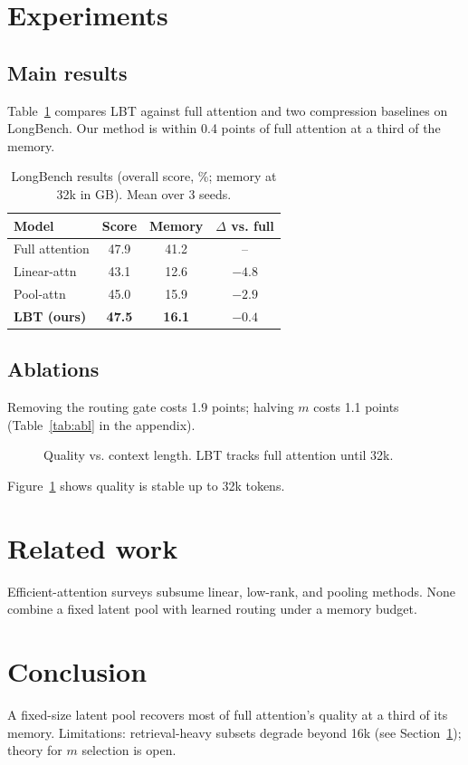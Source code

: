 \documentclass{article}
\begin{document}
\section{Experiments}\label{sec:exp}
\subsection{Main results}
Table~\ref{tab:main} compares LBT against full attention and two compression
baselines on LongBench. Our method is within 0.4 points of full attention at
a third of the memory.

\begin{table}[t]
\centering
\caption{LongBench results (overall score, \%; memory at 32k in GB). Mean over 3 seeds.}
\label{tab:main}
\begin{tabular}{lccc}
\toprule
Model & Score & Memory & $\Delta$ vs. full \\
\midrule
Full attention & 47.9 & 41.2 & -- \\
Linear-attn & 43.1 & 12.6 & $-4.8$ \\
Pool-attn & 45.0 & 15.9 & $-2.9$ \\
\textbf{LBT (ours)} & \textbf{47.5} & \textbf{16.1} & $-0.4$ \\
\bottomrule
\end{tabular}
\end{table}

\subsection{Ablations}
Removing the routing gate costs 1.9 points; halving $m$ costs 1.1 points
(Table~\ref{tab:abl} in the appendix).

\begin{figure}[t]
\centering
\caption{Quality vs. context length. LBT tracks full attention until 32k.}
\label{fig:len}
\end{figure}

Figure~\ref{fig:len} shows quality is stable up to 32k tokens.

\section{Related work}
Efficient-attention surveys subsume linear, low-rank, and pooling methods.
None combine a fixed latent pool with learned routing under a memory budget.

\section{Conclusion}
A fixed-size latent pool recovers most of full attention's quality at a third
of its memory. Limitations: retrieval-heavy subsets degrade beyond 16k
(see Section~\ref{sec:exp}); theory for $m$ selection is open.


\end{document}
